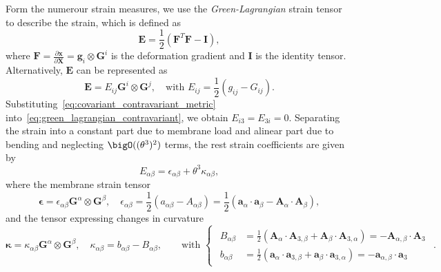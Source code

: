 Form the numerour strain measures, we use the \textit{Green-Lagrangian} strain tensor to describe the strain, which is defined as
\begin{equation}
	\label{eq:green_lagrangian}
	\mathbf{E} = \frac{1}{2}\left( \mathbf{F}^T\mathbf{F}-\mathbf{I} \right),
\end{equation}
where $\mathbf{F}=\frac{\partial \mathbf{x}}{\partial \mathbf{X}}=\mathbf{g}_i\otimes\mathbf{G}^i$ is the deformation gradient and $\mathbf{I}$ is the identity tensor. Alternatively, $\mathbf{E}$ can be represented as
\begin{equation}
	\label{eq:green_lagrangian_contravariant}
	\mathbf{E}=E_{ij}\mathbf{G}^i\otimes\mathbf{G}^j,\quad\text{with } E_{ij} = \frac{1}{2}\left( g_{ij}-G_{ij} \right).
\end{equation}
Substituting~\eqref{eq:covariant_contravariant_metric} into~\eqref{eq:green_lagrangian_contravariant}, we obtain $E_{i3}=E_{3i}=0$. Separating the strain into a constant part due to membrane load and alinear part due to bending and neglecting $\bigO((\theta^3)^2)$ terms, the rest strain coefficients are given by
\begin{equation}
	\label{}
	E_{\alpha\beta} = \epsilon_{\alpha\beta} + \theta^3\kappa_{\alpha\beta},
\end{equation}
where the membrane strain tensor
\begin{equation}
	\label{eq:membrane_strains}
	\mathbf{\epsilon} = \epsilon_{\alpha\beta}\mathbf{G}^\alpha\otimes\mathbf{G}^\beta, \quad\epsilon_{\alpha\beta} = \frac{1}{2}\left( a_{\alpha\beta}-A_{\alpha\beta} \right) = \frac{1}{2}\left( \mathbf{a}_{\alpha}\cdot\mathbf{a}_{\beta}-\mathbf{A}_{\alpha}\cdot\mathbf{A}_{\beta} \right),
\end{equation}
and the tensor expressing changes in curvature
\begin{equation}
	\label{eq:curvatures}
	\mathbf{\kappa} = \kappa_{\alpha\beta}\mathbf{G}^\alpha\otimes\mathbf{G}^\beta,\quad\kappa_{\alpha\beta} = b_{\alpha\beta}-B_{\alpha\beta},\qquad\text{with }
	\begin{cases}
		\begin{aligned}
			B_{\alpha\beta} & =\frac{1}{2}\left( \mathbf{A}_{\alpha}\cdot\mathbf{A}_{3,\beta}+\mathbf{A}_{\beta}\cdot\mathbf{A}_{3,\alpha}\right) = -\mathbf{A}_{\alpha,\beta}\cdot\mathbf{A}_3 \\
			b_{\alpha\beta} & =\frac{1}{2}\left( \mathbf{a}_{\alpha}\cdot\mathbf{a}_{3,\beta}+\mathbf{a}_{\beta}\cdot\mathbf{a}_{3,\alpha}\right)  =-\mathbf{a}_{\alpha,\beta}\cdot\mathbf{a}_3
		\end{aligned}
	\end{cases}.
\end{equation}

